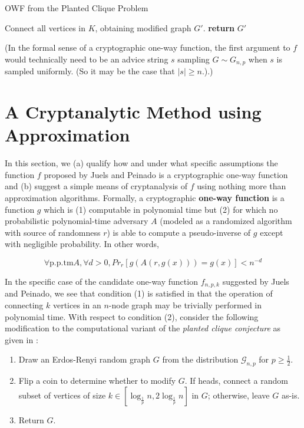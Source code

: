 \documentclass{article}
\theoremstyle{definition}
\begin{document}
\begin{algorithm}[H]
\caption{OWF from the Planted Clique Problem}\label{AMMDecode}
\begin{algorithmic}[1]
\State Connect all vertices in $K$, obtaining modified graph $G'$.
\State \textbf{return} $G'$
\EndProcedure
\end{algorithmic}
\end{algorithm}

\noindent (In the formal sense of a cryptographic one-way function, the first argument to 
$f$ would technically need to be an advice string $s$ sampling $G \sim G_{n,p}$ when $s$ is 
sampled uniformly.  (So it may be the case that $\lvert s \rvert \geq n$.).)  

\section{A Cryptanalytic Method using Approximation}

In this section, we (a) qualify how and under what specific assumptions the function $f$ 
proposed by Juels and Peinado is a cryptographic one-way function and (b) suggest a simple means of cryptanalysis of $f$ using nothing more than approximation algorithms.
\newline\newline
Formally, a cryptographic \textbf{one-way function} is a function $g$ which is (1) computable 
in polynomial time but (2) for which no probabilistic polynomial-time adversary $A$ 
(modeled as a randomized algorithm with source of randomness $r$) is able to 
compute a pseudo-inverse of $g$ except with negligible probability.  In other words,

\[ \forall \text{p.p.tm} A, \forall d > 0, Pr_r[g(A(r,g(x))) = g(x)] < n^{-d} \]

In the specific case of the candidate one-way function $f_{n,p,k}$ suggested by Juels and Peinado, 
we see that condition (1) is satisfied in that the operation of connecting $k$ vertices 
in an $n$-node graph may be trivially performed in polynomial time.  With respect to condition 
(2), consider the following modification to the computational variant of the 
\textit{planted clique conjecture} as given in \cite{PlantedCliqueSource}:

\begin{enumerate}
\item{Draw an Erdos-Renyi random graph $G$ from the distribution $\mathcal{G}_{n,p}$ for 
$p \geq \frac{1}{2}$.}
\item{Flip a coin to determine whether to modify $G$.  If heads, connect a random 
subset of vertices of size $k \in [\log_{\frac{1}{p}} n, 2\log_{\frac{1}{p}} n]$ in $G$; 
otherwise, leave $G$ as-is.}
\item{Return $G$.}
\end{enumerate}
\end{document}

